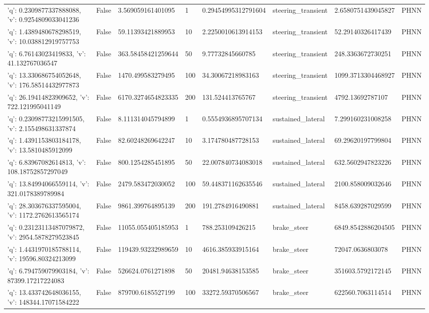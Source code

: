 \begin{tabular}{llllllll}
{'q': 0.2309877337888088, 'v': 0.9254809033041236} & False & 3.569059161401095 & 1 & 0.29454995312791604 & steering\_transient & 2.6580751439045827 & PHNN \\
{'q': 1.4389480678298519, 'v': 10.038812919757753} & False & 59.11393421889953 & 10 & 2.2250010613914153 & steering\_transient & 52.29140326417439 & PHNN \\
{'q': 6.76143023419833, 'v': 41.132767036547} & False & 363.58458421259644 & 50 & 9.77732845660785 & steering\_transient & 248.3363672730251 & PHNN \\
{'q': 13.330686754052648, 'v': 176.58514432977873} & False & 1470.499583279495 & 100 & 34.30067218983163 & steering\_transient & 1099.3713304468927 & PHNN \\
{'q': 26.19414823909652, 'v': 722.121995041149} & False & 6170.3274654823335 & 200 & 131.524413765767 & steering\_transient & 4792.13692787107 & PHNN \\
{'q': 0.23098773215991505, 'v': 2.155498631337874} & False & 8.111314045794899 & 1 & 0.5554936895707134 & sustained\_lateral & 7.299160231008258 & PHNN \\
{'q': 1.4391153803184178, 'v': 13.5810485912099} & False & 82.60248269642247 & 10 & 3.174780487728153 & sustained\_lateral & 69.29620197799804 & PHNN \\
{'q': 6.83967082614813, 'v': 108.18752857297049} & False & 800.1254285451895 & 50 & 22.007840734083018 & sustained\_lateral & 632.5602947823226 & PHNN \\
{'q': 13.84994066559114, 'v': 321.0178389789984} & False & 2479.583472030052 & 100 & 59.448371162635546 & sustained\_lateral & 2100.858009032646 & PHNN \\
{'q': 28.303676337595004, 'v': 1172.2762613565174} & False & 9861.399764895139 & 200 & 191.2784916490881 & sustained\_lateral & 8458.639287029599 & PHNN \\
{'q': 0.23123113487079872, 'v': 2954.5878279523845} & False & 11055.055405185953 & 1 & 788.253109426215 & brake\_steer & 6849.8542886204505 & PHNN \\
{'q': 1.4431970185788114, 'v': 19596.80324213099} & False & 119439.93232989659 & 10 & 4616.385933915164 & brake\_steer & 72047.0636803078 & PHNN \\
{'q': 6.794759079903184, 'v': 87399.17217224083} & False & 526624.0761271898 & 50 & 20481.94638153585 & brake\_steer & 351603.5792172145 & PHNN \\
{'q': 13.433742648036155, 'v': 148344.17071584222} & False & 879700.6185527199 & 100 & 33272.59370506567 & brake\_steer & 622560.7063114514 & PHNN \\

\end{tabular}
